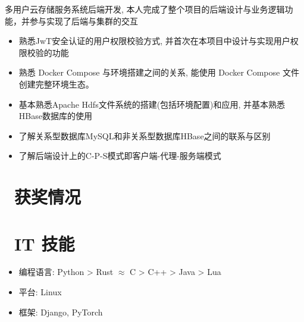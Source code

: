 \documentclass{resume}
\begin{document}
\begin{onehalfspacing}
多用户云存储服务系统后端开发, 本人完成了整个项目的后端设计与业务逻辑功能，并参与实现了后端与集群的交互
\begin{itemize}
  \item 熟悉JwT安全认证的用户权限校验方式, 并首次在本项目中设计与实现用户权限校验的功能
  \item 熟悉 Docker Compose 与环境搭建之间的关系, 能使用 Docker Compose 文件创建完整环境生态。
  \item 基本熟悉Apache Hdfs文件系统的搭建(包括环境配置)和应用, 并基本熟悉HBase数据库的使用
  \item 了解关系型数据库MySQL和非关系型数据库HBase之间的联系与区别
  \item 了解后端设计上的C-P-S模式即客户端-代理-服务端模式
\end{itemize}
\end{onehalfspacing}

\section{\faHeartO\ 获奖情况}

\section{\faCogs\ IT 技能}
\begin{itemize}[parsep=0.5ex]
  \item 编程语言: Python > Rust $\approx$ C > C++ > Java > Lua
  \item 平台: Linux
  \item 框架: Django, PyTorch
\end{itemize}


%
%
\end{document}
